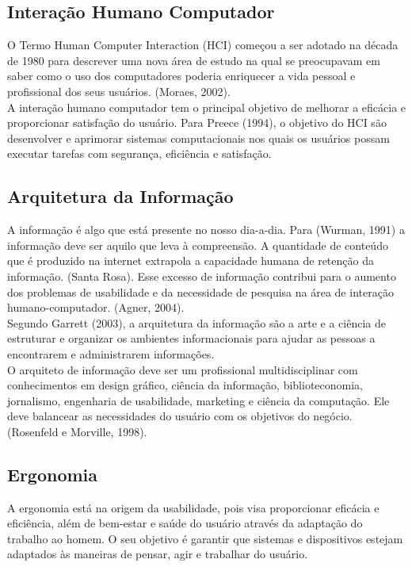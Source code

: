 \subsection{Interação Humano Computador}

	O Termo Human Computer Interaction  (HCI) começou a ser adotado na década de 1980 para descrever uma nova área de estudo na qual se preocupavam em saber como o uso dos computadores poderia enriquecer a vida pessoal e profissional dos seus usuários. (Moraes, 2002). \\
	A interação humano computador tem o principal objetivo de melhorar a eficácia e proporcionar satisfação do usuário. Para Preece (1994), o objetivo do HCI são desenvolver e aprimorar sistemas computacionais nos quais os usuários possam executar tarefas com segurança, eficiência e satisfação.

	
\subsection{Arquitetura da Informação}

A informação é algo que está presente no nosso dia-a-dia. Para (Wurman, 1991) a informação deve ser aquilo que leva à compreensão. A quantidade de conteúdo que é produzido na internet extrapola a capacidade humana de retenção da informação. (Santa Rosa). Esse excesso de informação contribui para o aumento dos problemas de usabilidade e da necessidade de pesquisa na área de interação humano-computador. (Agner, 2004).\\

Segundo Garrett (2003), a arquitetura da informação são a arte e a ciência de estruturar e organizar os ambientes informacionais para ajudar as pessoas a encontrarem e administrarem informações.\\

O arquiteto de informação deve ser um profissional multidisciplinar com conhecimentos em design gráfico, ciência da informação, biblioteconomia, jornalismo, engenharia de usabilidade, marketing e ciência da computação. Ele deve balancear as necessidades do usuário com os objetivos do negócio. (Rosenfeld e Morville, 1998).

\subsection{Ergonomia}

A ergonomia está na origem da usabilidade, pois visa proporcionar eficácia e eficiência, além de bem-estar e saúde do usuário através da adaptação do trabalho ao homem. O seu objetivo é garantir que sistemas e dispositivos estejam adaptados às maneiras de pensar, agir e trabalhar do usuário. ~\cite{cybis2010ergonomia}


